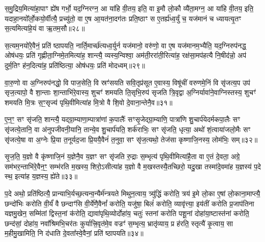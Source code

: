 स॒मु॒द्रिय॒मित्या॑हा॒पाꣳ ह्ये॑ष गर्भो॒ यद॒ग्निरग्न॒ आ या॑हि वी॒तय॒ इति॒ वा इ॒मौ लो॒कौ व्यै॑ता॒मग्न॒ आ या॑हि वी॒तय॒ इति॒ यदाहा॒नयो᳚र्लो॒कयो॒र्वीत्यै॒ प्रच्यु॑तो॒ वा ए॒ष आ॒यत॑ना॒दग॑तः प्रति॒ष्ठाꣳ स ए॒तर्\mbox{}ह्य॑ध्व॒र्युं च॒ यज॑मानं च ध्यायत्यृ॒तꣳ स॒त्यमित्या॑हे॒यं वा ऋ॒तम॒सौ॥२८॥

स॒त्यम॒नयो॑रे॒वैनं॒ प्रति॑ ष्ठापयति॒ नार्ति॒मार्च्छ॑त्यध्व॒र्युर्न यज॑मानो॒ वरु॑णो॒ वा ए॒ष यज॑मानम॒भ्यैति॒ यद॒ग्निरुप॑नद्ध॒ ओष॑धयः॒ प्रति॑ गृह्णीता॒ग्निमे॒तमित्या॑ह॒ शान्त्यै॒ व्यस्य॒न्विश्वा॒ अम॑ती॒ररा॑ती॒रित्या॑ह॒ रक्ष॑सा॒मप॑हत्यै नि॒षीद॑न्नो॒ अप॑ दुर्म॒तिꣳ ह॑न॒दित्या॑ह॒ प्रति॑ष्ठित्या॒ ओष॑धयः॒ प्रति॑ मोदध्वम्॥२९॥

{\anuvakamend[{अ॒स्त्व॒नु॒ष्टुब॑सि सादय॒त्यारू॑ढः॒ पत्वेति॒ गर्भ॑म॒सौ मो॑दध्वं॒ द्विच॑त्वारिꣳशच्च॥५॥}]}

{{}}

वा॒रु॒णो वा अ॒ग्निरुप॑नद्धो॒ वि पाज॒सेति॒ वि स्रꣳ॑सयति सवि॒तृप्र॑सूत ए॒वास्य॒ विषू॑चीं वरुणमे॒निं वि सृ॑जत्य॒प उप॑ सृज॒त्यापो॒ वै शा॒न्ताः शा॒न्ताभि॑रे॒वास्य॒ शुचꣳ॑ शमयति ति॒सृभि॒रुप॑ सृजति त्रि॒वृद्वा अ॒ग्निर्यावा॑ने॒वाग्निस्तस्य॒ शुचꣳ॑ शमयति मि॒त्रः स॒ꣳ॒सृज्य॑ पृथि॒वीमित्या॑ह मि॒त्रो वै शि॒वो दे॒वाना॒न्तेनै॒व॥३१॥

ए॒न॒ꣳ॒ सꣳ सृ॑जति॒ शान्त्यै॒ यद्ग्रा॒म्याणा॒म्पात्रा॑णां क॒पालैः᳚ सꣳसृ॒जेद्ग्रा॒म्याणि॒ पात्रा॑णि शु॒चार्प॑येदर्मकपा॒लैः सꣳ सृ॑जत्ये॒तानि॒ वा अ॑नुपजीवनी॒यानि॒ तान्ये॒व शु॒चार्प॑यति॒ शर्क॑राभिः॒ सꣳ सृ॑जति॒ धृत्या॒ अथो॑ शं॒त्वाया॑जलो॒मैः सꣳ सृ॑जत्ये॒षा वा अ॒ग्नेः प्रि॒या त॒नूर्यद॒जा प्रि॒ययै॒वैनं॑ त॒नुवा॒ सꣳ सृ॑ज॒त्यथो॒ तेज॑सा कृष्णाजि॒नस्य॒ लोम॑भिः॒ सम्॥३२॥

सृ॒ज॒ति॒ य॒ज्ञो वै कृ॑ष्णाजि॒नं य॒ज्ञेनै॒व य॒ज्ञꣳ सꣳ सृ॑जति रु॒द्राः स॒म्भृत्य॑ पृथि॒वीमित्या॑है॒ता वा ए॒तं दे॒वता॒ अग्रे॒ सम॑भर॒न्ताभि॑रे॒वैन॒ꣳ॒ सम्भ॑रति म॒खस्य॒ शिरो॒\-ऽसीत्या॑ह य॒ज्ञो वै म॒खस्तस्यै॒तच्छिरो॒ यदु॒खा तस्मा॑दे॒वमा॑ह य॒ज्ञस्य॑ प॒दे स्थ॒ इत्या॑ह य॒ज्ञस्य॒ ह्ये॑ते॥३३॥

प॒दे अथो॒ प्रति॑ष्ठित्यै॒ प्रान्याभि॒र्यच्छ॒त्यन्व॒न्यैर्म॑न्त्रयते मिथुन॒त्वाय॒ त्र्यु॑द्धिं करोति॒ त्रय॑ इ॒मे लो॒का ए॒षां लो॒काना॒माप्त्यै॒ छन्दो॑भिः करोति वी॒र्यं॑ वै छन्दाꣳ॑सि वी॒र्ये॑णै॒वैनां᳚ करोति॒ यजु॑षा॒ बिलं॑ करोति॒ व्यावृ॑त्त्या॒ इय॑तीं करोति प्र॒जाप॑तिना यज्ञमु॒खेन॒ सम्मि॑तां द्विस्त॒नां क॑रोति॒ द्यावा॑पृथि॒व्योर्दोहा॑य॒ चतुः॑ स्तनां करोति पशू॒नां दोहा॑या॒ष्टास्त॑नां करोति॒ छन्द॑सां॒ दोहा॑य॒ नवा᳚श्रिमभि॒चर॑तः कुर्यात्त्रि॒वृत॑मे॒व वज्रꣳ॑ स॒म्भृत्य॒ भ्रातृ॑व्याय॒ प्र ह॑रति॒ स्तृत्यै॑ कृ॒त्वाय॒ सा म॒हीमु॒खामिति॒ नि द॑धाति दे॒वता᳚स्वे॒वैनां॒ प्रति॑ ष्ठापयति॥३४॥

